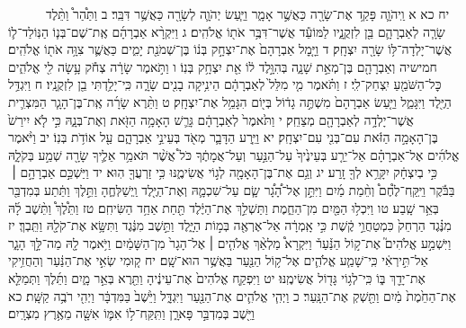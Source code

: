 \documentclass[twoside, openany, parskip=half, 11pt]{book}
\begin{document}
　　　יח כא א וַֽיהֹוָ֛ה פָּקַ֥ד אֶת־שָׂרָ֖ה כַּאֲשֶׁ֣ר אָמָ֑ר וַיַּ֧עַשׂ יְהֹוָ֛ה לְשָׂרָ֖ה כַּאֲשֶׁ֥ר דִּבֵּֽר׃ ב וַתַּ֩הַר֩ וַתֵּ֨לֶד שָׂרָ֧ה לְאַבְרָהָ֛ם בֵּ֖ן לִזְקֻנָ֑יו לַמּוֹעֵ֕ד אֲשֶׁר־דִּבֶּ֥ר אֹת֖וֹ אֱלֹהִֽים׃ ג וַיִּקְרָ֨א אַבְרָהָ֜ם אֶֽת־שֶׁם־בְּנ֧וֹ הַנּֽוֹלַד־ל֛וֹ אֲשֶׁר־יָלְדָה־לּ֥וֹ שָׂרָ֖ה יִצְחָֽק׃ ד וַיָּ֤מׇל אַבְרָהָם֙ אֶת־יִצְחָ֣ק בְּנ֔וֹ בֶּן־שְׁמֹנַ֖ת יָמִ֑ים כַּאֲשֶׁ֛ר צִוָּ֥ה אֹת֖וֹ אֱלֹהִֽים׃ חמישיה וְאַבְרָהָ֖ם בֶּן־מְאַ֣ת שָׁנָ֑ה בְּהִוָּ֣לֶד ל֔וֹ אֵ֖ת יִצְחָ֥ק בְּנֽוֹ׃ ו וַתֹּ֣אמֶר שָׂרָ֔ה צְחֹ֕ק עָ֥שָׂה לִ֖י אֱלֹהִ֑ים כׇּל־הַשֹּׁמֵ֖עַ יִֽצְחַק־לִֽי׃ ז וַתֹּ֗אמֶר מִ֤י מִלֵּל֙ לְאַבְרָהָ֔ם הֵינִ֥יקָה בָנִ֖ים שָׂרָ֑ה כִּֽי־יָלַ֥דְתִּי בֵ֖ן לִזְקֻנָֽיו׃ ח וַיִּגְדַּ֥ל הַיֶּ֖לֶד וַיִּגָּמַ֑ל וַיַּ֤עַשׂ אַבְרָהָם֙ מִשְׁתֶּ֣ה גָד֔וֹל בְּי֖וֹם הִגָּמֵ֥ל אֶת־יִצְחָֽק׃ ט וַתֵּ֨רֶא שָׂרָ֜ה אֶֽת־בֶּן־הָגָ֧ר הַמִּצְרִ֛ית אֲשֶׁר־יָלְדָ֥ה לְאַבְרָהָ֖ם מְצַחֵֽק׃ י וַתֹּ֙אמֶר֙ לְאַבְרָהָ֔ם גָּרֵ֛שׁ הָאָמָ֥ה הַזֹּ֖את וְאֶת־בְּנָ֑הּ כִּ֣י לֹ֤א יִירַשׁ֙ בֶּן־הָאָמָ֣ה הַזֹּ֔את עִם־בְּנִ֖י עִם־יִצְחָֽק׃ יא וַיֵּ֧רַע הַדָּבָ֛ר מְאֹ֖ד בְּעֵינֵ֣י אַבְרָהָ֑ם עַ֖ל אוֹדֹ֥ת בְּנֽוֹ׃ יב וַיֹּ֨אמֶר אֱלֹהִ֜ים אֶל־אַבְרָהָ֗ם אַל־יֵרַ֤ע בְּעֵינֶ֙יךָ֙ עַל־הַנַּ֣עַר וְעַל־אֲמָתֶ֔ךָ כֹּל֩ אֲשֶׁ֨ר תֹּאמַ֥ר אֵלֶ֛יךָ שָׂרָ֖ה שְׁמַ֣ע בְּקֹלָ֑הּ כִּ֣י בְיִצְחָ֔ק יִקָּרֵ֥א לְךָ֖ זָֽרַע׃ יג וְגַ֥ם אֶת־בֶּן־הָאָמָ֖ה לְג֣וֹי אֲשִׂימֶ֑נּוּ כִּ֥י זַרְעֲךָ֖ הֽוּא׃ יד וַיַּשְׁכֵּ֣ם אַבְרָהָ֣ם ׀ בַּבֹּ֡קֶר וַיִּֽקַּֽח־לֶ֩חֶם֩ וְחֵ֨מַת מַ֜יִם וַיִּתֵּ֣ן אֶל־הָ֠גָ֠ר שָׂ֧ם עַל־שִׁכְמָ֛הּ וְאֶת־הַיֶּ֖לֶד וַֽיְשַׁלְּחֶ֑הָ וַתֵּ֣לֶךְ וַתֵּ֔תַע בְּמִדְבַּ֖ר בְּאֵ֥ר שָֽׁבַע׃ טו וַיִּכְל֥וּ הַמַּ֖יִם מִן־הַחֵ֑מֶת וַתַּשְׁלֵ֣ךְ אֶת־הַיֶּ֔לֶד תַּ֖חַת אַחַ֥ד הַשִּׂיחִֽם׃ טז וַתֵּ֩לֶךְ֩ וַתֵּ֨שֶׁב לָ֜הּ מִנֶּ֗גֶד הַרְחֵק֙ כִּמְטַחֲוֵ֣י קֶ֔שֶׁת כִּ֣י אָֽמְרָ֔ה אַל־אֶרְאֶ֖ה בְּמ֣וֹת הַיָּ֑לֶד וַתֵּ֣שֶׁב מִנֶּ֔גֶד וַתִּשָּׂ֥א אֶת־קֹלָ֖הּ וַתֵּֽבְךְּ׃ יז וַיִּשְׁמַ֣ע אֱלֹהִים֮ אֶת־ק֣וֹל הַנַּ֒עַר֒ וַיִּקְרָא֩ מַלְאַ֨ךְ אֱלֹהִ֤ים ׀ אֶל־הָגָר֙ מִן־הַשָּׁמַ֔יִם וַיֹּ֥אמֶר לָ֖הּ מַה־לָּ֣ךְ הָגָ֑ר אַל־תִּ֣ירְאִ֔י כִּֽי־שָׁמַ֧ע אֱלֹהִ֛ים אֶל־ק֥וֹל הַנַּ֖עַר בַּאֲשֶׁ֥ר הוּא־שָֽׁם׃ יח ק֚וּמִי שְׂאִ֣י אֶת־הַנַּ֔עַר וְהַחֲזִ֥יקִי אֶת־יָדֵ֖ךְ בּ֑וֹ כִּֽי־לְג֥וֹי גָּד֖וֹל אֲשִׂימֶֽנּוּ׃ יט וַיִּפְקַ֤ח אֱלֹהִים֙ אֶת־עֵינֶ֔יהָ וַתֵּ֖רֶא בְּאֵ֣ר מָ֑יִם וַתֵּ֜לֶךְ וַתְּמַלֵּ֤א אֶת־הַחֵ֙מֶת֙ מַ֔יִם וַתַּ֖שְׁקְ אֶת־הַנָּֽעַר׃ כ וַיְהִ֧י אֱלֹהִ֛ים אֶת־הַנַּ֖עַר וַיִּגְדָּ֑ל וַיֵּ֙שֶׁב֙ בַּמִּדְבָּ֔ר וַיְהִ֖י רֹבֶ֥ה קַשָּֽׁת׃ כא וַיֵּ֖שֶׁב בְּמִדְבַּ֣ר פָּארָ֑ן וַתִּֽקַּֽח־ל֥וֹ אִמּ֛וֹ אִשָּׁ֖ה מֵאֶ֥רֶץ מִצְרָֽיִם׃
\end{document}
